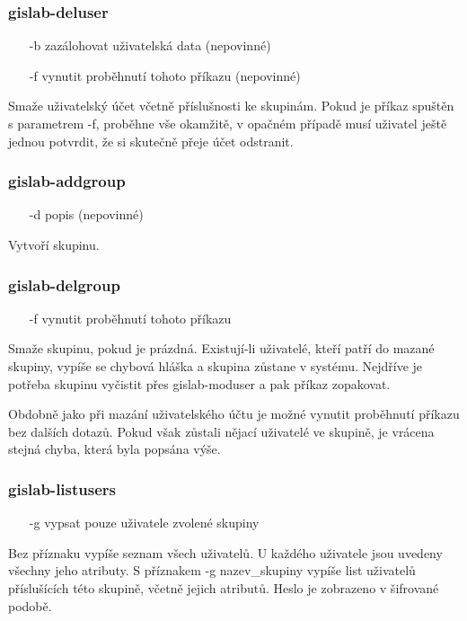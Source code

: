 \subsubsection{gislab-deluser}
\begin{itemize}
\item [-b] zazálohovat uživatelská data (nepovinné)
\item [-f] vynutit proběhnutí tohoto příkazu (nepovinné)
\end{itemize}
Smaže uživatelský účet včetně příslušnosti ke skupinám. Pokud je příkaz spuštěn s parametrem \textsf{-f}, proběhne vše okamžitě, v opačném případě musí uživatel ještě jednou potvrdit, že si skutečně přeje účet odstranit.

\subsubsection{gislab-addgroup}
\begin{itemize}
\item [-d] popis (nepovinné)
\end{itemize}
Vytvoří skupinu.

\subsubsection{gislab-delgroup}
\begin{itemize}
\item [-f] vynutit proběhnutí tohoto příkazu
\end{itemize}
Smaže skupinu, pokud je prázdná. Existují-li uživatelé, kteří patří do mazané skupiny, vypíše se chybová hláška a skupina zůstane v systému. Nejdříve je potřeba skupinu vyčistit přes \textsf{gislab-moduser} a pak příkaz zopakovat.

Obdobně jako při mazání uživatelského účtu je možné vynutit proběhnutí příkazu bez dalších dotazů. Pokud však zůstali nějací uživatelé ve skupině, je vrácena stejná chyba, která byla popsána výše.

\subsubsection{gislab-listusers}
\begin{itemize}
\item [-g] vypsat pouze uživatele zvolené skupiny
\end{itemize}
Bez příznaku vypíše seznam všech uživatelů. U každého uživatele jsou uvedeny všechny jeho atributy. S příznakem \textsf{-g nazev\_skupiny} vypíše list uživatelů příslušících této skupině, včetně jejich atributů. Heslo je zobrazeno v šifrované podobě. 

